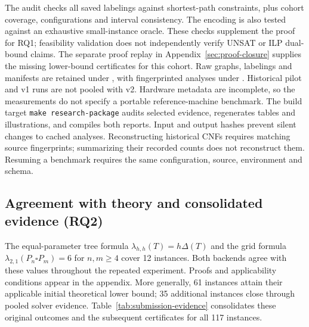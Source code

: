 The audit checks all saved labelings against shortest-path constraints,
plus cohort coverage, configurations and interval consistency. The
encoding is also tested against an exhaustive small-instance oracle.
These checks supplement the proof for RQ1; feasibility validation does
not independently verify UNSAT or ILP dual-bound claims. The separate
proof replay in Appendix~\ref{sec:proof-closure} supplies the missing
lower-bound certificates for this cohort. Raw graphs,
labelings and manifests are retained under , with
fingerprinted analyses under . Historical pilot
and v1 runs are not pooled with v2. Hardware metadata are incomplete,
so the measurements do not specify a portable reference-machine benchmark.
The build target \texttt{make research-package} audits selected evidence,
regenerates tables and illustrations, and compiles both reports. Input and
output hashes prevent silent changes to cached analyses. Reconstructing
historical CNFs requires matching source fingerprints; summarizing their
recorded counts does not reconstruct them. Resuming a benchmark requires
the same configuration, source, environment and schema.

\subsection{Agreement with theory and consolidated evidence (RQ2)}
The equal-parameter tree formula
$\lambda_{h,h}(T)=h\Delta(T)$ and the grid formula
$\lambda_{2,1}(P_n\square P_m)=6$ for $n,m\geq4$ cover 12 instances.
Both backends agree with these values throughout the repeated experiment.
Proofs and applicability conditions appear in the appendix. More generally,
61 instances attain their applicable initial theoretical lower bound;
35 additional instances close through pooled solver evidence.
Table~\ref{tab:submission-evidence} consolidates these original outcomes
and the subsequent certificates for all 117 instances.

\begin{table}[htbp]
\centering\small
\caption{Consolidated optimality evidence on the 117 graph--parameter tasks.}
\label{tab:submission-evidence}

\end{table}

